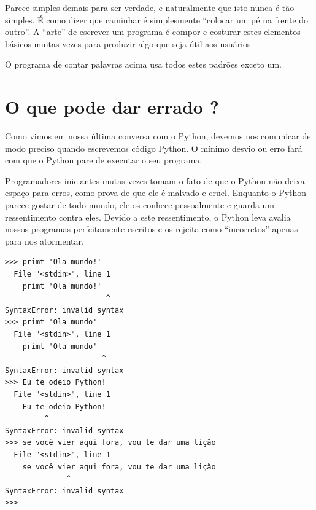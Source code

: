 Parece simples demais para ser verdade, e naturalmente que isto nunca
é tão simples. É como dizer que caminhar é simplesmente ``colocar
um pé na frente do outro''. A ``arte'' de escrever um programa é
compor e costurar estes elementos básicos muitas vezes para produzir
algo que seja útil aos usuários.
%

O programa de contar palavras acima usa todos estes padrões exceto um.
%

\section{O que pode dar errado ?}
%

Como vimos em nossa última conversa com o Python, devemos nos comunicar
de modo preciso quando escrevemos código Python. O mínimo desvio ou erro
fará com que o Python pare de executar o seu programa.
%

Programadores iniciantes mutas vezes tomam o fato de que o Python não deixa
espaço para erros, como prova de que ele é malvado e cruel.
Enquanto o Python parece gostar de todo mundo, ele os conhece pessoalmente e
guarda um ressentimento contra eles. Devido a este ressentimento, o Python
leva avalia nossos programas perfeitamente escritos e os rejeita como ``incorretos''
apenas para nos atormentar.
%

\beforeverb
\begin{verbatim}
>>> primt 'Ola mundo!'
  File "<stdin>", line 1
    primt 'Ola mundo!'
                       ^
SyntaxError: invalid syntax
>>> primt 'Ola mundo'
  File "<stdin>", line 1
    primt 'Ola mundo'
                      ^
SyntaxError: invalid syntax
>>> Eu te odeio Python!
  File "<stdin>", line 1
    Eu te odeio Python!
         ^
SyntaxError: invalid syntax
>>> se você vier aqui fora, vou te dar uma lição
  File "<stdin>", line 1
    se você vier aqui fora, vou te dar uma lição
              ^
SyntaxError: invalid syntax
>>>
\end{verbatim}
\afterverb

